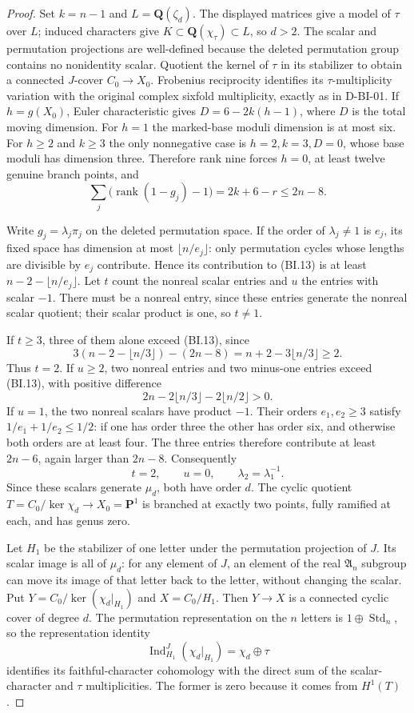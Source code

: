 \begin{proof}
Set $k=n-1$ and $L=\mathbf Q(\zeta_d)$.  The displayed matrices
give a model of $\tau$ over $L$; induced characters give
$K\subset\mathbf Q(\chi_\tau)\subset L$, so $d>2$.
The scalar and permutation projections are well-defined because
the deleted permutation group contains no nonidentity scalar.
Quotient the kernel of $\tau$ in its
stabilizer to obtain a connected $J$-cover $C_0\to X_0$.
Frobenius reciprocity identifies its $\tau$-multiplicity variation
with the original complex sixfold multiplicity, exactly as in
D-BI-01.  If $h=g(X_0)$, Euler characteristic gives
$D=6-2k(h-1)$, where $D$ is the total moving dimension.
For $h=1$ the marked-base moduli dimension is at most six.  For
$h\ge2$ and $k\ge3$ the only nonnegative case is $h=2,k=3,D=0$,
whose base moduli has dimension three.  Therefore rank nine forces
$h=0$, at least twelve genuine branch points, and
\[
       \sum_j\bigl(\operatorname{rank}(1-g_j)-1\bigr)
                    =2k+6-r\le2n-8.
\tag{BI.13}
\]

Write $g_j=\lambda_j\pi_j$ on the deleted permutation space.
If the order of $\lambda_j\ne1$ is $e_j$, its fixed space has
dimension at most $\lfloor n/e_j\rfloor$: only permutation cycles
whose lengths are divisible by $e_j$ contribute.  Hence its
contribution to (BI.13) is at least
$n-2-\lfloor n/e_j\rfloor$.
Let $t$ count the nonreal scalar entries and $u$ the entries
with scalar $-1$.  There must be a nonreal entry, since these
entries generate the nonreal scalar quotient; their scalar
product is one, so $t\ne1$.

If $t\ge3$, three of them alone exceed (BI.13), since
\[
 3(n-2-\lfloor n/3\rfloor)-(2n-8)
                   =n+2-3\lfloor n/3\rfloor\ge2.
\]
Thus $t=2$.  If $u\ge2$, two nonreal entries and two minus-one
entries exceed (BI.13), with positive difference
\[
               2n-2\lfloor n/3\rfloor-2\lfloor n/2\rfloor>0.
\]
If $u=1$, the two nonreal scalars have product $-1$.
Their orders $e_1,e_2\ge3$ satisfy
$1/e_1+1/e_2\le1/2$: if one has order three the other has order
six, and otherwise both orders are at least four.  The three
entries therefore contribute at least $2n-6$, again larger than
$2n-8$.  Consequently
\[
             t=2,\qquad u=0,\qquad
             \lambda_2=\lambda_1^{-1}.
\tag{BI.14}
\]
Since these scalars generate $\mu_d$, both have order $d$.
The cyclic quotient $T=C_0/\ker\chi_d\to X_0=\mathbf P^1$
is branched at exactly two points, fully ramified at each, and
has genus zero.

Let $H_1$ be the stabilizer of one letter under the permutation
projection of $J$.  Its scalar image is all of $\mu_d$:
for any element of $J$, an element of the real $\mathfrak A_n$
subgroup can move its image of that letter back to the letter,
without changing the scalar.  Put
$Y=C_0/\ker(\chi_d|_{H_1})$ and $X=C_0/H_1$.  Then $Y\to X$
is a connected cyclic cover of degree $d$.  The permutation
representation on the $n$ letters is $1\oplus\operatorname{Std}_n$,
so the representation identity
\[
 \operatorname{Ind}_{H_1}^{J}(\chi_d|_{H_1})
       =\chi_d\oplus\tau
\tag{BI.15}
\]
identifies its faithful-character cohomology with the direct sum
of the scalar-character and $\tau$ multiplicities.  The former
is zero because it comes from $H^1(T)$.


\end{proof}
